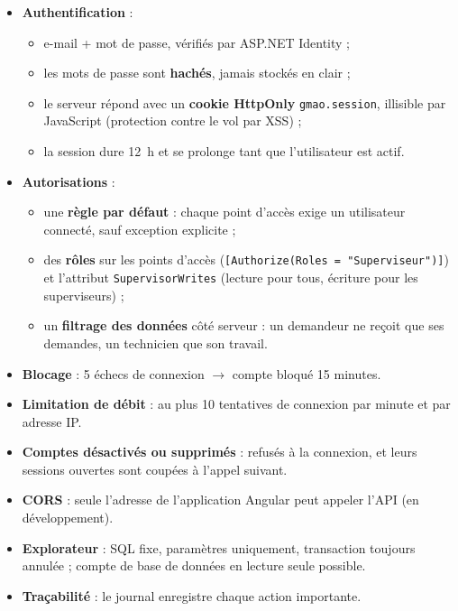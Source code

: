 \documentclass[11pt,a4paper]{article}
\newcommand{\code}[1]{\texttt{\small #1}}                   %
\begin{document}
\begin{itemize}
  \item \textbf{Authentification} :
    \begin{itemize}
      \item e-mail + mot de passe, vérifiés par ASP.NET Identity ;
      \item les mots de passe sont \textbf{hachés}, jamais stockés en clair ;
      \item le serveur répond avec un \textbf{cookie HttpOnly} \code{gmao.session}, illisible par JavaScript (protection contre le vol par XSS) ;
      \item la session dure 12~h et se prolonge tant que l'utilisateur est actif.
    \end{itemize}
  \item \textbf{Autorisations} :
    \begin{itemize}
      \item une \textbf{règle par défaut} : chaque point d'accès exige un utilisateur connecté, sauf exception explicite ;
      \item des \textbf{rôles} sur les points d'accès (\code{[Authorize(Roles = "Superviseur")]}) et l'attribut \code{SupervisorWrites} (lecture pour tous, écriture pour les superviseurs) ;
      \item un \textbf{filtrage des données} côté serveur : un demandeur ne reçoit que ses demandes, un technicien que son travail.
    \end{itemize}
  \item \textbf{Blocage} : 5 échecs de connexion $\rightarrow$ compte bloqué 15 minutes.
  \item \textbf{Limitation de débit} : au plus 10 tentatives de connexion par minute et par adresse IP.
  \item \textbf{Comptes désactivés ou supprimés} : refusés à la connexion, et leurs sessions ouvertes sont coupées à l'appel suivant.
  \item \textbf{CORS} : seule l'adresse de l'application Angular peut appeler l'API (en développement).
  \item \textbf{Explorateur} : SQL fixe, paramètres uniquement, transaction toujours annulée ; compte de base de données en lecture seule possible.
  \item \textbf{Traçabilité} : le journal enregistre chaque action importante.
\end{itemize}

\end{document}
